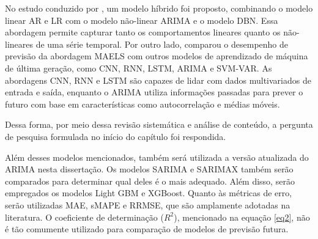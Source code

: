 No estudo conduzido por , um modelo híbrido foi proposto, combinando o modelo linear AR e LR com o modelo não-linear ARIMA e o modelo DBN. Essa abordagem permite capturar tanto os comportamentos lineares quanto os não-lineares de uma série temporal. Por outro lado,  comparou o desempenho de previsão da abordagem MAELS com outros modelos de aprendizado de máquina de última geração, como CNN, RNN, LSTM, ARIMA e SVM-VAR. As abordagens CNN, RNN e LSTM são capazes de lidar com dados multivariados de entrada e saída, enquanto o ARIMA utiliza informações passadas para prever o futuro com base em características como autocorrelação e médias móveis.

Dessa forma, por meio dessa revisão sistemática e análise de conteúdo, a pergunta de pesquisa formulada no início do capítulo foi respondida.

Além desses modelos mencionados, também será utilizada a versão atualizada do ARIMA nesta dissertação. Os modelos SARIMA e SARIMAX também serão comparados para determinar qual deles é o mais adequado. Além disso, serão empregados os modelos Light GBM e XGBoost. Quanto às métricas de erro, serão utilizadas MAE, sMAPE e RRMSE, que são amplamente adotadas na literatura. O coeficiente de determinação ($R^2$), mencionado na equação \eqref{eq2}, não é tão comumente utilizado para comparação de modelos de previsão futura.
